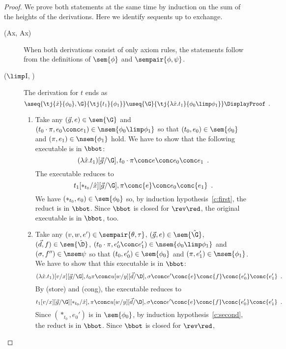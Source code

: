 \begin{proof}
 We prove both statements at the same time by induction on the sum of
 the heights of the derivations.  Here we identify sequents up to exchange.
  \begin{description}
  \item[(Ax, Ax)] When both derivations consist of only axiom rules,
       the statements follow from the definitions of $\sem{\phi}$ and
       $\sempair{\phi,\psi}$.
   \item[($\limp$I, \textminus)]
	The derivation for $t$ ends as
	\[
	\aseq{\tj{\hat x}{\phi_0},\G}{\tj{t_1}{\phi_1}}
	\useq{\G}{\tj{\lambda{\hat{x}}.t_1}{\phi_0\limp\phi_1}}
	\DisplayProof\enspace.
	\]
	\begin{enumerate}[label=\textit{(\arabic{*})}]
	 \item Take any
	       $(\vec g, e)\in\sem{\G}$
	       and
	       $(t_0\cdot\pi,e_0\conc e_1)\in\nsem{\phi_0\limp\phi_1}$
	       so that $(t_0,e_0)\in\sem{\phi_0}$ and
	       $(\pi,e_1)\in\nsem{\phi_1}$ hold.
	       We have to show that the following executable is in
	       $\bbot$:
	       \[
	       (\lambda\hat x.t_1)[\vec g/\G],
	       t_0\cdot\pi\conc e\conc e_0\conc e_1\enspace.
	       \]
	       The executable reduces to
	       \[
		t_1[\ast_{t_0}/\hat x][\vec{g}/\G],\pi\conc{e}\conc e_0\conc{e_1}\enspace.
	       \]
	       We have $(\ast_{t_0}, e_0)\in\sem{\phi_0}$ so, by
	       induction hypothesis~\ref{c:first},
	       the reduct is in $\bbot$.
	       Since $\bbot$ is closed for $\rev\red$, the original
	       executable is in $\bbot$, too.
	 \item Take any $(v,w,e')\in\sempair{\theta,\tau}$,
	       $(\vec g, e)\in\sem{\hat\G}$,
	       $(\vec d, f)\in\sem{\hat\D}$,
	       $(t_0\cdot\pi,e_0'\conc e_1')\in\nsem{\phi_0\limp\phi_1}$ and
	       $(\sigma,f'')\in\nsem\psi$ so that
	       $(t_0,e_0')\in\sem{\phi_0}$ and
	       $(\pi,e_1')\in\nsem{\phi_1}$.
	       We have to show that this executable is in $\bbot$:
	       \[
	       (\lambda \hat x. t_1)[v/x][\vec{g}/\G],t_0\pi\conc
	       u[w/y][\vec{d}/\D],\sigma\conc
	       e'\conc {e}\conc {f} \conc{e_0'}\conc{e_1'}\enspace.
	       \]
	       By (store) and (cong), the executable reduces to
	       \[
		t_1[v/x][\vec{g}/\G][\ast_{t_0}/\hat x],\pi\conc
	       u[w/y][\vec{d}/\D],\sigma\conc
	       e'\conc {e}\conc {f} \conc{e_0'}\conc{e_1'}\enspace.
	       \]
	       Since $(\ast_{t_0},e_0')$ is in $\sem{\phi_0}$,
	       by induction hypothesis~\ref{c:second}, the reduct is in
	       $\bbot$.  Since $\bbot$ is closed for $\rev\red$,

\end{enumerate}
\end{description}
\end{proof}
